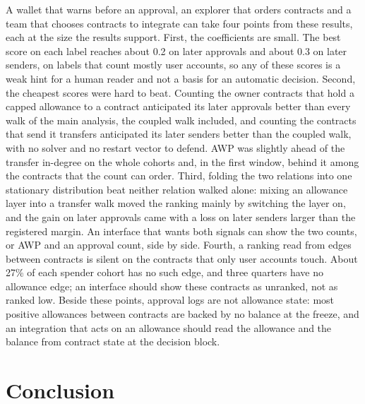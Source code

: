 \documentclass{ieeeaccess}
\begin{document}
A wallet that warns before an approval, an explorer that orders contracts and a team that chooses contracts to integrate can take four points from these results, each at the size the results support. First, the coefficients are small. The best score on each label reaches about 0.2 on later approvals and about 0.3 on later senders, on labels that count mostly user accounts, so any of these scores is a weak hint for a human reader and not a basis for an automatic decision. Second, the cheapest scores were hard to beat. Counting the owner contracts that hold a capped allowance to a contract anticipated its later approvals better than every walk of the main analysis, the coupled walk included, and counting the contracts that send it transfers anticipated its later senders better than the coupled walk, with no solver and no restart vector to defend. AWP was slightly ahead of the transfer in-degree on the whole cohorts and, in the first window, behind it among the contracts that the count can order. Third, folding the two relations into one stationary distribution beat neither relation walked alone: mixing an allowance layer into a transfer walk moved the ranking mainly by switching the layer on, and the gain on later approvals came with a loss on later senders larger than the registered margin. An interface that wants both signals can show the two counts, or AWP and an approval count, side by side. Fourth, a ranking read from edges between contracts is silent on the contracts that only user accounts touch. About 27\% of each spender cohort has no such edge, and three quarters have no allowance edge; an interface should show these contracts as unranked, not as ranked low. Beside these points, approval logs are not allowance state: most positive allowances between contracts are backed by no balance at the freeze, and an integration that acts on an allowance should read the allowance and the balance from contract state at the decision block.

\section{Conclusion}
\label{sec:conclusion}
\end{document}
